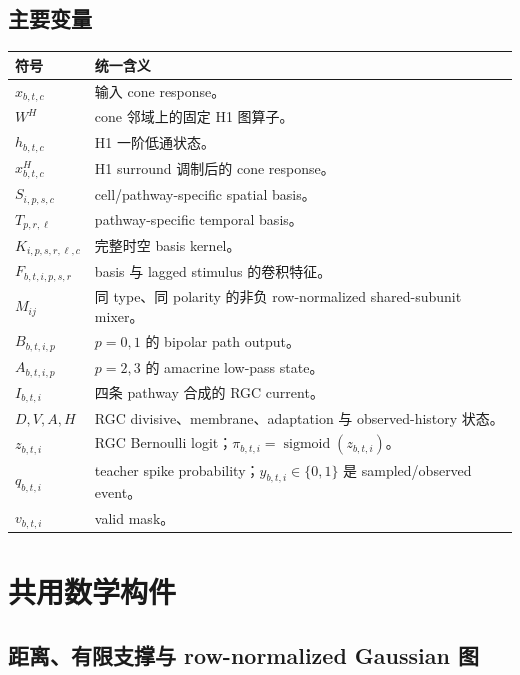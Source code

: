 \documentclass[UTF8,12pt,a4paper]{ctexart}
\numberwithin{equation}{section}
\newcommand{\sigmoid}{\operatorname{sigmoid}}
\begin{document}
\subsection{主要变量}

\begin{longtable}{>{\centering\arraybackslash}p{}>{\raggedright\arraybackslash}p{}}
\toprule
符号 & 统一含义 \\
\midrule
$x_{b,t,c}$ & 输入 cone response。\\
$W^H$ & cone 邻域上的固定 H1 图算子。\\
$h_{b,t,c}$ & H1 一阶低通状态。\\
$x^H_{b,t,c}$ & H1 surround 调制后的 cone response。\\
$S_{i,p,s,c}$ & cell/pathway-specific spatial basis。\\
$T_{p,r,\ell}$ & pathway-specific temporal basis。\\
$K_{i,p,s,r,\ell,c}$ & 完整时空 basis kernel。\\
$F_{b,t,i,p,s,r}$ & basis 与 lagged stimulus 的卷积特征。\\
$M_{ij}$ & 同 type、同 polarity 的非负 row-normalized shared-subunit mixer。\\
$B_{b,t,i,p}$ & $p=0,1$ 的 bipolar path output。\\
$A_{b,t,i,p}$ & $p=2,3$ 的 amacrine low-pass state。\\
$I_{b,t,i}$ & 四条 pathway 合成的 RGC current。\\
$D,V,A,H$ & RGC divisive、membrane、adaptation 与 observed-history 状态。\\
$z_{b,t,i}$ & RGC Bernoulli logit；$\pi_{b,t,i}=\sigmoid(z_{b,t,i})$。\\
$q_{b,t,i}$ & teacher spike probability；$y_{b,t,i}\in\{0,1\}$ 是 sampled/observed event。\\
$v_{b,t,i}$ & valid mask。\\
\bottomrule
\end{longtable}

\section{共用数学构件}

\subsection{距离、有限支撑与 row-normalized Gaussian 图}
\end{document}
